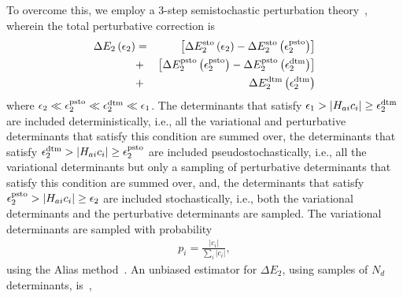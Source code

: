 \documentclass[%
reprint,
 superscriptaddress,
 amsmath,amssymb,
 aps,
]{revtex4-1}
\def\Nd{{N_d}}
\def\beq{\begin{eqnarray}}
\def\eeq{\end{eqnarray}}
\begin{document}
To overcome this, we employ a 3-step semistochastic perturbation theory~\cite{LiOttHolShaUmr-JCP-18}, wherein the total perturbative correction is
\beq
\Delta E_{2} \left(\epsilon_{2}\right) &=& 
  \left[\Delta E_{2}^{\mathrm{sto}} \left(\epsilon_{2} \right) - \Delta E_{2}^{\mathrm{sto}} \left(\epsilon_{2}^{\rm psto}\right)\right] \nonumber \\
&+& \left[\Delta E_{2}^{\mathrm{psto}} \left(\epsilon_{2}^{\rm psto} \right) - \Delta E_{2}^{\mathrm{psto}} \left(\epsilon_{2}^{\rm dtm}\right)\right] \nonumber \\
&+& \Delta E_{2} ^{\mathrm{dtm}} \left(\epsilon_{2} ^{\mathrm{dtm}}\right)
\label{eq:semistoch_3-step_PT}
\eeq
where $\epsilon_{2} \ll \epsilon_{2}^{\rm psto} \ll \epsilon_{2}^{\rm dtm} \ll \epsilon_{1}$.
The determinants that satisfy $\epsilon_{1} > \left|H_{ai} c_{i}\right| \ge \epsilon_{2}^{\rm dtm}$ are included deterministically, i.e., all
the variational and perturbative determinants that satisfy this condition are summed over,
the determinants that satisfy $\epsilon_{2}^{\rm dtm} > \left|H_{ai} c_{i}\right| \ge \epsilon_{2}^{\rm psto}$ are included pseudostochastically, i.e., all
the variational determinants but only a sampling of perturbative determinants that satisfy this condition are summed over, and,
the determinants that satisfy $\epsilon_{2}^{\rm psto} > \left|H_{ai} c_{i}\right| \ge \epsilon_{2}$ are included stochastically, i.e., both
the variational determinants and the perturbative determinants are sampled.
The variational determinants are sampled with probability
\beq
p_i = \frac{|c_i|}{\sum_i |c_i|},
\eeq
using the Alias method~\cite{walker1977efficient,kronmal1979alias}.
An unbiased estimator for $\Delta E_{2}$, using samples of $\Nd$ determinants, is~\cite{ShaHolJeaAlaUmr-JCTC-17},
\end{document}
